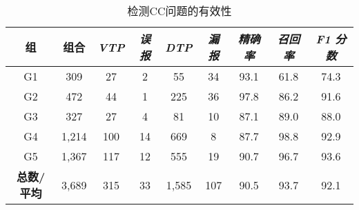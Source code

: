 \begin{table}[htbp]
	\centering
	\begin{threeparttable}
	\caption{\tool{}检测CC问题的有效性}
	\label{tab:RQ4}
	\begin{tabularx}{0.86\textwidth}{@{}ccccccccc@{}}
		\toprule
		\textbf{组}& \textbf{组合}& \textbf{\textit{VTP}} & \textbf{\textit{误报}} & \textbf{\textit{DTP}} & \textbf{\textit{漏报}} & \textbf{\textit{精确率}} & \textbf{\textit{召回率}} & \textbf{\textit{F1 分数}} \\ 
		\midrule
		G1    &  309   & 27   & 2   & 55   & 34  &  93.1 & 61.8  &  74.3  \\
		G2    &  472   & 44   & 1   & 225  & 36  &  97.8 & 86.2  &  91.6  \\
		G3    &  327   & 27   & 4   & 81   & 10  &  87.1 & 89.0  &  88.0  \\
		G4    &  1,214  & 100  & 14  & 669  & 8   &  87.7 & 98.8  &  92.9  \\
		G5    &  1,367  & 117  & 12  & 555  & 19  &  90.7 & 96.7  &  93.6  \\
		\midrule
		\textbf{总数/平均}  & 3,689  & 315 & 33 & 1,585 & 107 & 90.5 &  93.7 & 92.1   \\
		\bottomrule
	\end{tabularx}
	\end{threeparttable}
\end{table}